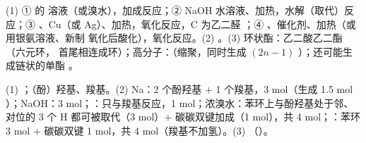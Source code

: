 \begin{jiexilist}
\item (1) ①  的  溶液（或溴水），加成反应；② NaOH 水溶液、加热，水解（取代）反应；③ 、Cu（或 Ag）、加热，氧化反应，C 为乙二醛 ；④ 、催化剂、加热（或用银氨溶液、新制  氧化后酸化），氧化反应。(2) 。(3) 环状酯：乙二酸乙二酯（六元环， 首尾相连成环）；高分子：（缩聚，同时生成 $(2n-1)$ ）；还可能生成链状的单酯 。
\item (1) ；（酚）羟基、羧基。(2) Na：2 个酚羟基 $+$ 1 个羧基，3 mol（生成 1.5 mol ）；NaOH：3 mol；：只与羧基反应，1 mol；浓溴水：苯环上与酚羟基处于邻、对位的 3 个 H 都可被取代（3 mol）$+$ 碳碳双键加成（1 mol），共 4 mol；：苯环 3 mol $+$ 碳碳双键 1 mol，共 4 mol（羧基不加氢）。(3) （）。
\end{jiexilist}
